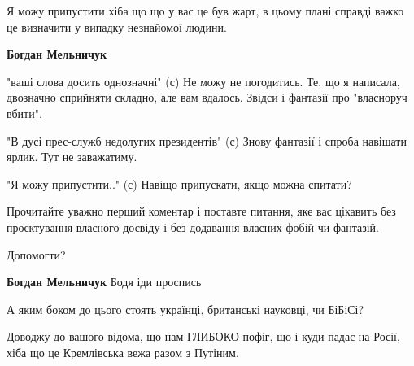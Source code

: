 \begin{itemize}
\begin{itemize}
\begin{itemize}
Я можу припустити хіба що що у вас це був жарт, в цьому плані справді важко це
визначити у випадку незнайомої людини.

 
\textbf{Богдан Мельничук} 

"ваші слова досить однозначні" (с) Не можу не погодитись. Те, що я написала,
двозначно сприйняти складно, але вам вдалось. Звідси і фантазії про "власноруч
вбити".

"В дусі прес-служб недолугих президентів" (с) Знову фантазії і спроба навішати
ярлик. Тут не заважатиму.

"Я можу припустити.." (с) Навіщо припускати, якщо можна спитати?

Прочитайте уважно перший коментар і поставте питання, яке вас цікавить без
проєктування власного досвіду і без додавання власних фобій чи фантазій.

Допомогти?

 
\textbf{Богдан Мельничук} Бодя іди проспись

\end{itemize}

\end{itemize}

 

А яким боком до цього стоять українці, британські науковці, чи БіБіСі?

Доводжу до вашого відома, що нам ГЛИБОКО пофіг, що і куди падає на Росії, хіба
що це Кремлівська вежа разом з Путіним.

\begin{itemize}
 

\end{itemize}
\end{itemize}
